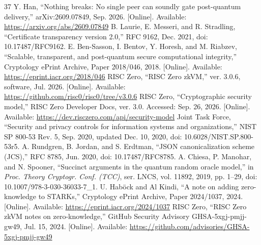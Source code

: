 \begin{thebibliography}{37}
Y. Han, ``Nothing breaks: No single peer can soundly gate post-quantum delivery,'' arXiv:2609.07849, Sep. 2026. [Online]. Available: \url{https://arxiv.org/abs/2609.07849}
B. Laurie, E. Messeri, and R. Stradling, ``Certificate transparency version 2.0,'' RFC 9162, Dec. 2021, doi: 10.17487/RFC9162.
E. Ben-Sasson, I. Bentov, Y. Horesh, and M. Riabzev, ``Scalable, transparent, and post-quantum secure computational integrity,'' Cryptology ePrint Archive, Paper 2018/046, 2018. [Online]. Available: \url{https://eprint.iacr.org/2018/046}
RISC Zero, ``RISC Zero zkVM,'' ver. 3.0.6, software, Jul. 2026. [Online]. Available: \url{https://github.com/risc0/risc0/tree/v3.0.6}
RISC Zero, ``Cryptographic security model,'' RISC Zero Developer Docs, ver. 3.0. Accessed: Sep. 26, 2026. [Online]. Available: \url{https://dev.risczero.com/api/security-model}
Joint Task Force, ``Security and privacy controls for information systems and organizations,'' NIST SP 800-53 Rev. 5, Sep. 2020, updated Dec. 10, 2020, doi: 10.6028/NIST.SP.800-53r5.
A. Rundgren, B. Jordan, and S. Erdtman, ``JSON canonicalization scheme (JCS),'' RFC 8785, Jun. 2020, doi: 10.17487/RFC8785.
A. Chiesa, P. Manohar, and N. Spooner, ``Succinct arguments in the quantum random oracle model,'' in \emph{Proc. Theory Cryptogr. Conf. (TCC)}, ser. LNCS, vol. 11892, 2019, pp. 1--29, doi: 10.1007/978-3-030-36033-7\_1.
U. Hab\"ock and Al Kindi, ``A note on adding zero-knowledge to STARKs,'' Cryptology ePrint Archive, Paper 2024/1037, 2024. [Online]. Available: \url{https://eprint.iacr.org/2024/1037}
RISC Zero, ``RISC Zero zkVM notes on zero-knowledge,'' GitHub Security Advisory GHSA-5xgj-pmjj-gw49, Jul. 15, 2024. [Online]. Available: \url{https://github.com/advisories/GHSA-5xgj-pmjj-gw49}
\end{thebibliography}
